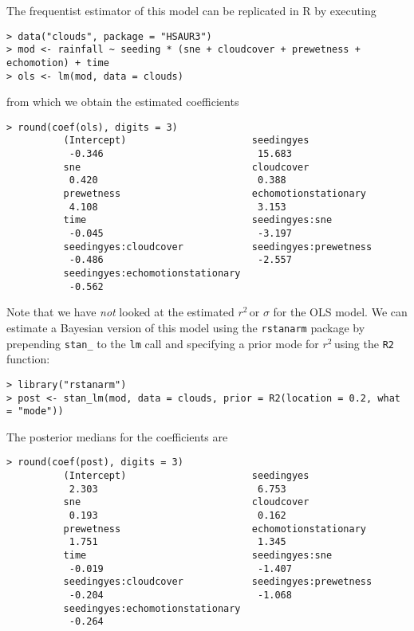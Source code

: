 \documentclass[11pt]{article}
\newcommand{\Rsq}{$r^2\,$}
\begin{document}
The frequentist estimator of this model can be replicated in R by executing

\begin{lstlisting}
> data("clouds", package = "HSAUR3")
> mod <- rainfall ~ seeding * (sne + cloudcover + prewetness + echomotion) + time
> ols <- lm(mod, data = clouds)
\end{lstlisting}

from which we obtain the estimated coefficients

\begin{lstlisting}
> round(coef(ols), digits = 3)
          (Intercept)                      seedingyes
           -0.346                           15.683
          sne                              cloudcover
           0.420                            0.388
          prewetness                       echomotionstationary
           4.108                            3.153
          time                             seedingyes:sne
           -0.045                           -3.197
          seedingyes:cloudcover            seedingyes:prewetness
           -0.486                           -2.557
          seedingyes:echomotionstationary
           -0.562
\end{lstlisting}

Note that we have \emph{not} looked at the estimated \Rsq or $\sigma$ for the
OLS model. We can estimate a Bayesian version of this model using the
{\tt rstanarm} package by prepending {\tt stan\_} to the {\tt lm} call and
specifying a prior mode for \Rsq using the {\tt R2} function:

\begin{lstlisting}
> library("rstanarm")
> post <- stan_lm(mod, data = clouds, prior = R2(location = 0.2, what = "mode"))
\end{lstlisting}

The posterior medians for the coefficients are

\begin{lstlisting}
> round(coef(post), digits = 3)
          (Intercept)                      seedingyes
           2.303                            6.753
          sne                              cloudcover
           0.193                            0.162
          prewetness                       echomotionstationary
           1.751                            1.345
          time                             seedingyes:sne
           -0.019                           -1.407
          seedingyes:cloudcover            seedingyes:prewetness
           -0.204                           -1.068
          seedingyes:echomotionstationary
           -0.264
\end{lstlisting}
\end{document}
